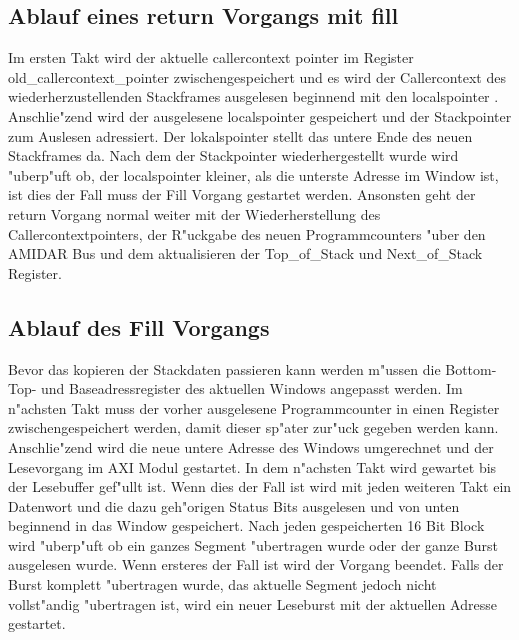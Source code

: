 \subsection{Ablauf eines return Vorgangs mit fill}
Im ersten Takt wird der aktuelle callercontext pointer im Register old\_callercontext\_pointer zwischengespeichert und es wird der Callercontext des wiederherzustellenden Stackframes ausgelesen beginnend mit den localspointer . 
Anschlie"zend wird der ausgelesene localspointer gespeichert und der Stackpointer zum Auslesen adressiert. Der lokalspointer stellt das untere Ende des neuen Stackframes da. Nach dem der Stackpointer wiederhergestellt wurde wird "uberp"uft ob, der localspointer kleiner, als die unterste Adresse im Window ist, ist dies der Fall muss der Fill Vorgang gestartet werden.  
Ansonsten geht der return Vorgang normal weiter mit der Wiederherstellung des Callercontextpointers, der R"uckgabe des neuen Programmcounters "uber den AMIDAR Bus und dem aktualisieren der Top\_of\_Stack und Next\_of\_Stack Register. 

\subsection {Ablauf des Fill Vorgangs}

Bevor das kopieren der Stackdaten passieren kann werden m"ussen die Bottom- Top- und Baseadressregister des aktuellen Windows angepasst werden. Im n"achsten Takt muss der vorher ausgelesene Programmcounter in einen Register zwischengespeichert werden, damit dieser sp"ater zur"uck gegeben werden kann. Anschlie"zend wird die neue untere Adresse des Windows umgerechnet und der Lesevorgang im AXI Modul gestartet. In dem n"achsten Takt wird gewartet bis der Lesebuffer gef"ullt ist. Wenn dies der Fall ist wird mit jeden weiteren Takt ein Datenwort und die dazu geh"origen Status Bits ausgelesen und von unten beginnend in das Window gespeichert. Nach jeden gespeicherten 16 Bit Block wird "uberp"uft ob ein ganzes Segment "ubertragen wurde oder der ganze Burst ausgelesen wurde. Wenn ersteres der Fall ist wird der Vorgang beendet. Falls der Burst komplett "ubertragen wurde, das aktuelle Segment jedoch nicht vollst"andig "ubertragen ist, wird ein neuer Leseburst mit der aktuellen Adresse gestartet. 

